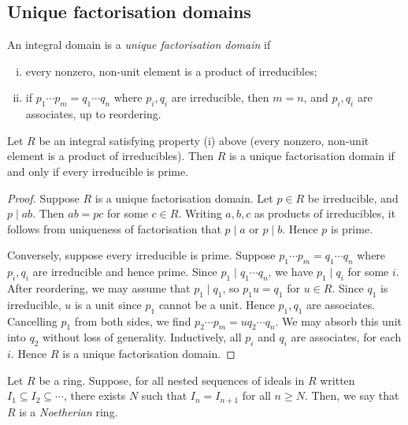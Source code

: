 \subsection{Unique factorisation domains}
\begin{definition}
	An integral domain is a \textit{unique factorisation domain} if
	\begin{enumerate}[(i)]
		\item every nonzero, non-unit element is a product of irreducibles;
		\item if \( p_1 \cdots p_m = q_1 \cdots q_n \) where \( p_i, q_i \) are irreducible, then \( m = n \), and \( p_i, q_i \) are associates, up to reordering.
	\end{enumerate}
\end{definition}
\begin{proposition}
	Let \( R \) be an integral satisfying property (i) above (every nonzero, non-unit element is a product of irreducibles).
	Then \( R \) is a unique factorisation domain if and only if every irreducible is prime.
\end{proposition}
\begin{proof}
	Suppose \( R \) is a unique factorisation domain.
	Let \( p \in R \) be irreducible, and \( p \mid ab \).
	Then \( ab = pc \) for some \( c \in R \).
	Writing \( a, b, c \) as products of irreducibles, it follows from uniqueness of factorisation that \( p \mid a \) or \( p \mid b \).
	Hence \( p \) is prime.

	Conversely, suppose every irreducible is prime.
	Suppose \( p_1 \cdots p_m = q_1 \cdots q_n \) where \( p_i, q_i \) are irreducible and hence prime.
	Since \( p_1 \mid q_1 \cdots q_n \), we have \( p_1 \mid q_i \) for some \( i \).
	After reordering, we may assume that \( p_1 \mid q_1 \), so \( p_1 u = q_1 \) for \( u \in R \).
	Since \( q_1 \) is irreducible, \( u \) is a unit since \( p_1 \) cannot be a unit.
	Hence \( p_1, q_1 \) are associates.
	Cancelling \( p_1 \) from both sides, we find \( p_2 \cdots p_m = u q_2 \cdots q_n \).
	We may absorb this unit into \( q_2 \) without loss of generality.
	Inductively, all \( p_i \) and \( q_i \) are associates, for each \( i \).
	Hence \( R \) is a unique factorisation domain.
\end{proof}
\begin{definition}
	Let \( R \) be a ring.
	Suppose, for all nested sequences of ideals in \( R \) written \( I_1 \subseteq I_2 \subseteq \cdots \), there exists \( N \) such that \( I_n = I_{n+1} \) for all \( n \geq N \).
	Then, we say that \( R \) is a \textit{Noetherian} ring.
\end{definition}
